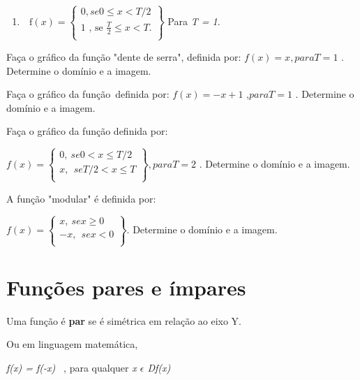 \begin{exercicios}
\begin{enumerate}[label=\alph*]
	\item \( \text{~ f} \left( x \right) = \left\{ \begin{matrix}
	0, se 0 \leq  x<T/2\\
	\text{1 , se }\frac{T}{2} \leq  x<T.\\
	\end{matrix}\right\}
	\)
	Para \textit{T = 1}. 
\end{enumerate}

	\exitem{} Faça o gráfico da função "dente de serra", definida por: \( f \left( x \right) = x, para T = 1 \) . Determine o domínio e a imagem.

	\exitem{} Faça o gráfico da função~definida por: \( f \left( x \right) =-x+\text{1 ,} para T=1 \) . Determine o domínio e a imagem.

	\exitem{} Faça o gráfico da função definida por:

	\( f \left( x \right) = \left\{ \begin{matrix}
	0,~ se 0<x \leq T/2\\
	x,~~se  T/2<x \leq T\\
	\end{matrix}\right\}
 	, para T=2  \) . Determine o domínio e a imagem.

	\exitem{} A função "modular" é definida por:

	\( f \left( x \right) = \left\{ \begin{matrix}
	x,~ se x  \geq 0\\
	-x,~~se  x<0\\
	\end{matrix}\right\}
  	\).  Determine o domínio e a imagem.

\end{exercicios}
\section{Funções pares e ímpares}
\begin{caixa}
\begin{tdefinicao}

Uma função é \textbf{par} se é simétrica em relação ao eixo Y. 

Ou em linguagem matemática, 

\quad \textit{f(x) = f(-x)~ }, \quad \quad para qualquer \textit{x $ \epsilon $   Df(x)} \qedsymbol{}
\end{tdefinicao}
\end{caixa}

